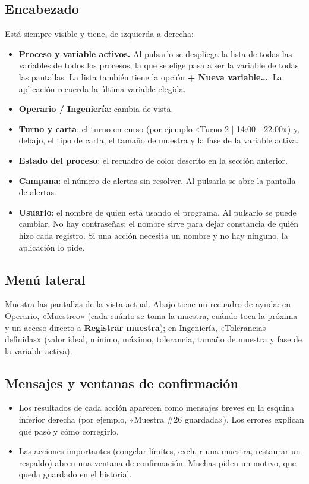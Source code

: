 \documentclass[11pt,a4paper]{article}
\newcommand{\boton}[1]{\textbf{#1}}                      %
\newcommand{\campo}[1]{«#1»}                             %
\begin{document}
\subsection{Encabezado}
Está siempre visible y tiene, de izquierda a derecha:
\begin{itemize}
\item \textbf{Proceso y variable activos.} Al pulsarlo se despliega la lista de todas las variables
  de todos los procesos; la que se elige pasa a ser la variable de todas las pantallas. La lista
  también tiene la opción \boton{+ Nueva variable\ldots}. La aplicación recuerda la última
  variable elegida.
\item \textbf{Operario / Ingeniería}: cambia de vista.
\item \textbf{Turno y carta}: el turno en curso (por ejemplo \campo{Turno 2 | 14:00 - 22:00}) y,
  debajo, el tipo de carta, el tamaño de muestra y la fase de la variable activa.
\item \textbf{Estado del proceso}: el recuadro de color descrito en la sección anterior.
\item \textbf{Campana}: el número de alertas sin resolver. Al pulsarla se abre la pantalla de
  alertas.
\item \textbf{Usuario}: el nombre de quien está usando el programa. Al pulsarlo se puede cambiar.
  No hay contraseñas: el nombre sirve para dejar constancia de quién hizo cada registro. Si una
  acción necesita un nombre y no hay ninguno, la aplicación lo pide.
\end{itemize}

\subsection{Menú lateral}
Muestra las pantallas de la vista actual. Abajo tiene un recuadro de ayuda: en Operario,
\campo{Muestreo} (cada cuánto se toma la muestra, cuándo toca la próxima y un acceso directo a
\boton{Registrar muestra}); en Ingeniería, \campo{Tolerancias definidas} (valor ideal, mínimo,
máximo, tolerancia, tamaño de muestra y fase de la variable activa).

\subsection{Mensajes y ventanas de confirmación}
\begin{itemize}
\item Los resultados de cada acción aparecen como mensajes breves en la esquina inferior derecha
  (por ejemplo, \campo{Muestra \#26 guardada}). Los errores explican qué pasó y cómo corregirlo.
\item Las acciones importantes (congelar límites, excluir una muestra, restaurar un respaldo)
  abren una ventana de confirmación. Muchas piden un motivo, que queda guardado en el historial.
\end{itemize}
\end{document}
